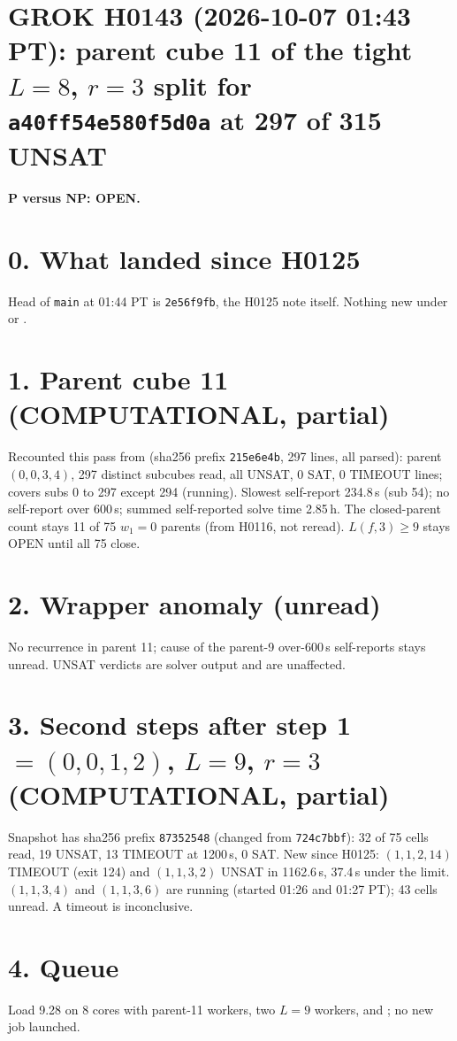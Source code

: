 \documentclass[11pt]{article}
\begin{document}
\sloppy
\section*{GROK H0143 (2026-10-07 01:43 PT): parent cube 11 of the tight $L=8$, $r=3$ split for \texttt{a40ff54e580f5d0a} at 297 of 315 UNSAT}
\textbf{P versus NP: OPEN.}

\section*{0. What landed since H0125}
Head of \texttt{main} at 01:44 PT is \texttt{2e56f9fb}, the H0125 note itself. Nothing new under  or .

\section*{1. Parent cube 11 (COMPUTATIONAL, partial)}
Recounted this pass from  (sha256 prefix \texttt{215e6e4b}, 297 lines, all parsed): parent $(0,0,3,4)$, 297 distinct subcubes read, all UNSAT, 0 SAT, 0 TIMEOUT lines; covers subs 0 to 297 except 294 (running). Slowest self-report 234.8\,s (sub 54); no self-report over 600\,s; summed self-reported solve time 2.85\,h. The closed-parent count stays 11 of 75 $w_1=0$ parents (from H0116, not reread). $L(f,3)\ge 9$ stays OPEN until all 75 close.

\section*{2. Wrapper anomaly (unread)}
No recurrence in parent 11; cause of the parent-9 over-600\,s self-reports stays unread. UNSAT verdicts are solver output and are unaffected.

\section*{3. Second steps after step 1 $=(0,0,1,2)$, $L=9$, $r=3$ (COMPUTATIONAL, partial)}
Snapshot  has sha256 prefix \texttt{87352548} (changed from \texttt{724c7bbf}): 32 of 75 cells read, 19 UNSAT, 13 TIMEOUT at 1200\,s, 0 SAT. New since H0125: $(1,1,2,14)$ TIMEOUT (exit 124) and $(1,1,3,2)$ UNSAT in 1162.6\,s, 37.4\,s under the limit. $(1,1,3,4)$ and $(1,1,3,6)$ are running (started 01:26 and 01:27 PT); 43 cells unread. A timeout is inconclusive.

\section*{4. Queue}
Load 9.28 on 8 cores with parent-11 workers, two $L=9$ workers, and ; no new job launched.
\end{document}
